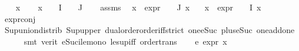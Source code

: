 \begin{isabellebody}
\isamarkupfalse%
\isanewline
\ \ \isamarkupfalse%
\ x\isanewline
\ \ \isamarkupfalse%
\ {\isachardoublequoteopen}x\ {\isasymin}\ {\isacharparenleft}{\kern0pt}{\isasymPhi}\ {\isacharbackquote}{\kern0pt}\ I\ {\isasymunion}\ {\isasymPhi}\ {\isacharbackquote}{\kern0pt}\ J{\isacharparenright}{\kern0pt}{\isachardoublequoteclose}\isanewline
\ \ \isamarkupfalse%
\ assms\ \isamarkupfalse%
\ {\isachardoublequoteopen}{\isasymforall}x\ {\isasymin}\ {\isacharparenleft}{\kern0pt}{\isacharparenleft}{\kern0pt}expr{\isacharunderscore}{\kern0pt}{}\ {\isasymcirc}\ {\isasymPhi}{\isacharparenright}{\kern0pt}\ {\isacharbackquote}{\kern0pt}\ J{\isacharparenright}{\kern0pt}{\isachardot}{\kern0pt}\ x\ {\isacharless}{\kern0pt}{\isacharequal}{\kern0pt}\ {}{\isachardoublequoteclose}\isanewline
{}\ {\isachardoublequoteopen}{\isasymforall}x\ {\isasymin}\ {\isacharparenleft}{\kern0pt}{\isacharparenleft}{\kern0pt}expr{\isacharunderscore}{\kern0pt}{}\ {\isasymcirc}\ {\isasymPhi}{\isacharparenright}{\kern0pt}\ {\isacharbackquote}{\kern0pt}\ I{\isacharparenright}{\kern0pt}{\isachardot}{\kern0pt}\ x\ {\isacharless}{\kern0pt}{\isacharequal}{\kern0pt}\ {}{\isachardoublequoteclose}\isanewline
\ \ \ \ \isamarkupfalse%
\ expr{\isacharunderscore}{\kern0pt}{}{\isacharunderscore}{\kern0pt}conj\isanewline
\ \ \ \ \isamarkupfalse%
\ Sup{\isacharunderscore}{\kern0pt}union{\isacharunderscore}{\kern0pt}distrib\ Sup{\isacharunderscore}{\kern0pt}upper\ dual{\isacharunderscore}{\kern0pt}order{\isachardot}{\kern0pt}order{\isacharunderscore}{\kern0pt}iff{\isacharunderscore}{\kern0pt}strict\ one{\isacharunderscore}{\kern0pt}eSuc\ plus{\isacharunderscore}{\kern0pt}{}{\isacharunderscore}{\kern0pt}eSuc{\isacharparenleft}{\kern0pt}{}{\isacharparenright}{\kern0pt}\ one{\isacharunderscore}{\kern0pt}add{\isacharunderscore}{\kern0pt}one\isanewline
\ \ \ \ \isamarkupfalse%
\ {\isacharparenleft}{\kern0pt}smt\ {\isacharparenleft}{\kern0pt}verit{\isacharparenright}{\kern0pt}\ eSuc{\isacharunderscore}{\kern0pt}ile{\isacharunderscore}{\kern0pt}mono\ le{\isacharunderscore}{\kern0pt}sup{\isacharunderscore}{\kern0pt}iff\ order{\isacharunderscore}{\kern0pt}trans{\isacharparenright}{\kern0pt}{\isacharplus}{\kern0pt}\isanewline
\ \ \isamarkupfalse%
\ e{}{\isacharcolon}{\kern0pt}\ {\isachardoublequoteopen}expr{\isacharunderscore}{\kern0pt}{}\ x\ {\isasymle}\ {}{\isachardoublequoteclose}\isanewline

\end{isabellebody}
